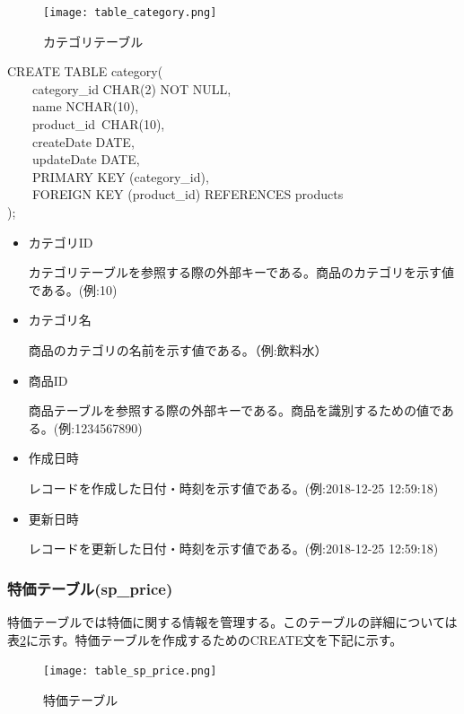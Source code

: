 \documentclass[a4j]{jarticle}
\begin{document}
\begin{figure}[H]
  \begin{center}
    \texttt{[image: table\_category.png]} \\
    \caption{カテゴリテーブル}
    \label{table_category}
  \end{center}
\end{figure}

\begin{screen}
  CREATE TABLE category( \\
  　　category\_id CHAR(2) NOT NULL, \\
  　　name NCHAR(10), \\
  　　product\_id\ CHAR(10), \\
  　　createDate DATE, \\
  　　updateDate DATE, \\
  　　PRIMARY KEY (category\_id), \\
  　　FOREIGN KEY (product\_id) REFERENCES products \\
  );
\end{screen}

\begin{itemize}
\item カテゴリID\par
  カテゴリテーブルを参照する際の外部キーである。商品のカテゴリを示す値である。(例:10)
\item カテゴリ名\par
  商品のカテゴリの名前を示す値である。（例:飲料水）
\item 商品ID\par
  商品テーブルを参照する際の外部キーである。商品を識別するための値である。(例:1234567890)
\item 作成日時\par
  レコードを作成した日付・時刻を示す値である。(例:2018-12-25 12:59:18)
\item 更新日時\par
  レコードを更新した日付・時刻を示す値である。(例:2018-12-25 12:59:18)
\end{itemize}
\subsubsection{特価テーブル(sp\_price)}
特価テーブルでは特価に関する情報を管理する。このテーブルの詳細については表\ref{table_sp_price}に示す。特価テーブルを作成するためのCREATE文を下記に示す。
\begin{figure}[H]
  \begin{center}
    \texttt{[image: table\_sp\_price.png]} \\
    \caption{特価テーブル}
    \label{table_sp_price}
  \end{center}
\end{figure}
\end{document}
